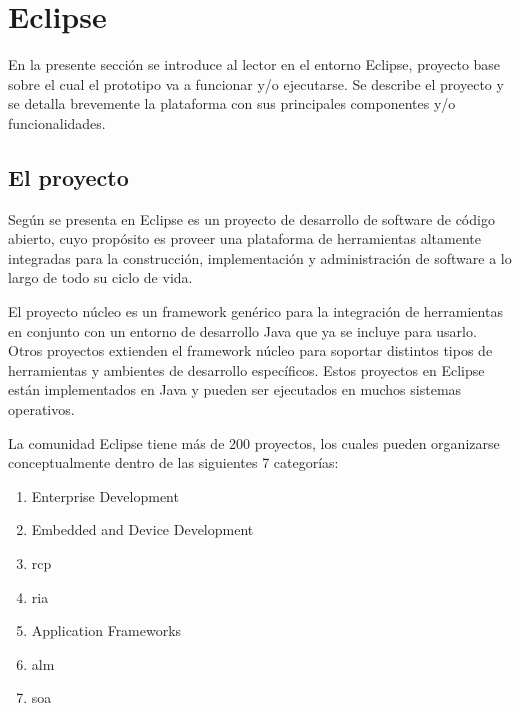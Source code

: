 \documentclass[a4paper,12pt,twoside,spanish,openright]{book}
\begin{document}
\section{Eclipse}


En la presente sección se introduce al lector en el entorno \textsf{Eclipse}, proyecto base sobre el cual el prototipo va a funcionar y/o ejecutarse. Se describe el proyecto y se detalla brevemente la plataforma con sus principales componentes y/o funcionalidades.


\subsection{El proyecto}

Según se presenta en \cite{EMFADG, Eclipse} \textsf{Eclipse} es un proyecto de desarrollo de software de código abierto, cuyo propósito es proveer una plataforma de herramientas altamente integradas para la construcción, implementación y administración de software a lo largo de todo su ciclo de vida.

El proyecto núcleo es un framework genérico para la integración de herramientas en conjunto con un entorno de desarrollo \textsf{Java} que ya se incluye para usarlo. Otros proyectos extienden el framework núcleo para soportar distintos tipos de herramientas y ambientes de desarrollo específicos. Estos proyectos en \textsf{Eclipse} están implementados en \textsf{Java} y pueden ser ejecutados en muchos sistemas operativos.

La comunidad \textsf{Eclipse} tiene más de 200 proyectos, los cuales pueden organizarse conceptualmente dentro de las siguientes 7 categorías:

\begin{enumerate}

\item Enterprise Development

\item Embedded and Device Development

\item \gls{rcp}

\item \gls{ria}

\item Application Frameworks

\item \gls{alm}

\item \gls{soa}

\end{enumerate}
\end{document}
